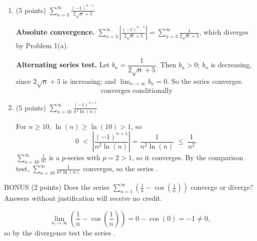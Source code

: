 \documentclass[12pt]{article}
\renewcommand{\emph}[1]{\textsf{\textbf{#1}}}
\newcommand{\ds}{\displaystyle}
\begin{document}
\begin{enumerate}
\begin{enumerate}
  \item (5 points) $\ds \sum_{n=3}^{\infty} \frac{(-1)^{n-1}}{2 \sqrt{n} +5}$
    \begin{solution}
      \emph{Absolute convergence.} $\ds\sum_{n=3}^\infty \left| \frac{(-1)^{n-1}}{2\sqrt{n}+5} \right|
      = \sum_{n=3}^\infty \frac{1}{2\sqrt{n}+5}$, which diverges by Problem 1(a).

      \emph{Alternating series test.} Let $b_n = \dfrac{1}{2\sqrt{n}+5}$. Then $b_n > 0$;
      $b_n$ is decreasing, since $2\sqrt{n}+5$ is increasing; and
      $\ds\lim_{n\to\infty} b_n = 0$. So the series converges.
      \[
        \boxed{\text{converges conditionally}}
      \]
    \end{solution}
    \vfill

  \item (5 points) $\ds \sum_{n=10}^{\infty} \frac{(-1)^{n+1}}{n^2 \ln(n)}$
    \begin{solution}
      For $n \ge 10$, $\ln(n) \ge \ln(10) > 1$, so
      \[
        0 \;<\; \left| \frac{(-1)^{n+1}}{n^2 \ln(n)} \right| = \frac{1}{n^2 \ln(n)} \;\le\; \frac{1}{n^2}.
      \]
      $\ds\sum_{n=10}^\infty \frac{1}{n^2}$ is a $p$-series with $p = 2 > 1$, so it converges.
      By the comparison test, $\ds\sum_{n=10}^\infty \frac{1}{n^2 \ln(n)}$ converges, so the
      series .
    \end{solution}
    \vfill
  \end{enumerate}

  \newpage

  BONUS (2 points) Does the series $\ds \sum_{n=1}^{\infty} \left( \frac{1}{n} -
    \cos\left(\frac{1}{n}\right) \right)$ converge or diverge? Answers
  without justification will receive no credit.
  \begin{solution}
    \[
      \lim_{n\to\infty} \left( \frac1n - \cos\left( \frac1n \right) \right) = 0 - \cos(0) = -1 \neq 0,
    \]
    so by the divergence test the series .
  \end{solution}

\end{enumerate}
\end{document}
